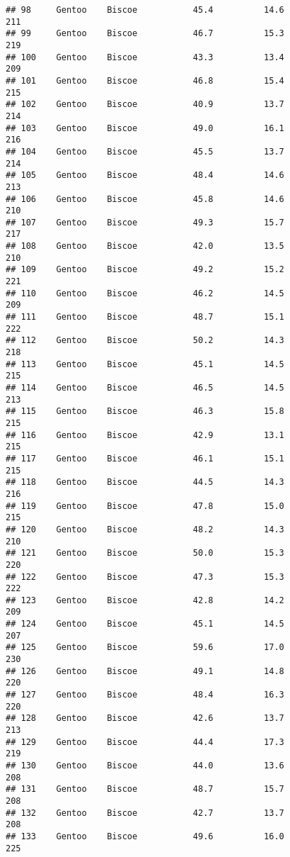 \documentclass[
]{article}
\begin{document}
\begin{verbatim}
## 98     Gentoo    Biscoe           45.4          14.6               211
## 99     Gentoo    Biscoe           46.7          15.3               219
## 100    Gentoo    Biscoe           43.3          13.4               209
## 101    Gentoo    Biscoe           46.8          15.4               215
## 102    Gentoo    Biscoe           40.9          13.7               214
## 103    Gentoo    Biscoe           49.0          16.1               216
## 104    Gentoo    Biscoe           45.5          13.7               214
## 105    Gentoo    Biscoe           48.4          14.6               213
## 106    Gentoo    Biscoe           45.8          14.6               210
## 107    Gentoo    Biscoe           49.3          15.7               217
## 108    Gentoo    Biscoe           42.0          13.5               210
## 109    Gentoo    Biscoe           49.2          15.2               221
## 110    Gentoo    Biscoe           46.2          14.5               209
## 111    Gentoo    Biscoe           48.7          15.1               222
## 112    Gentoo    Biscoe           50.2          14.3               218
## 113    Gentoo    Biscoe           45.1          14.5               215
## 114    Gentoo    Biscoe           46.5          14.5               213
## 115    Gentoo    Biscoe           46.3          15.8               215
## 116    Gentoo    Biscoe           42.9          13.1               215
## 117    Gentoo    Biscoe           46.1          15.1               215
## 118    Gentoo    Biscoe           44.5          14.3               216
## 119    Gentoo    Biscoe           47.8          15.0               215
## 120    Gentoo    Biscoe           48.2          14.3               210
## 121    Gentoo    Biscoe           50.0          15.3               220
## 122    Gentoo    Biscoe           47.3          15.3               222
## 123    Gentoo    Biscoe           42.8          14.2               209
## 124    Gentoo    Biscoe           45.1          14.5               207
## 125    Gentoo    Biscoe           59.6          17.0               230
## 126    Gentoo    Biscoe           49.1          14.8               220
## 127    Gentoo    Biscoe           48.4          16.3               220
## 128    Gentoo    Biscoe           42.6          13.7               213
## 129    Gentoo    Biscoe           44.4          17.3               219
## 130    Gentoo    Biscoe           44.0          13.6               208
## 131    Gentoo    Biscoe           48.7          15.7               208
## 132    Gentoo    Biscoe           42.7          13.7               208
## 133    Gentoo    Biscoe           49.6          16.0               225

\end{verbatim}
\end{document}
